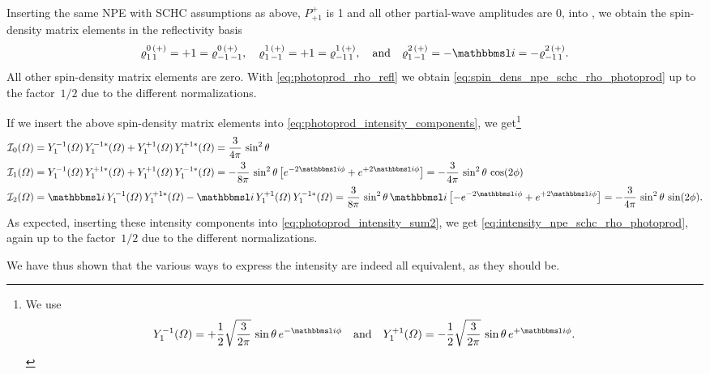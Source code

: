 Inserting the same NPE with SCHC assumptions as above, \ie $P^+_{+1}$
is 1 and all other partial-wave amplitudes are 0, into
, we obtain
the spin-density matrix elements in the reflectivity basis
\begin{equation}
  \varrho^{0\, (+)}_{1\, 1}
  = +1
  = \varrho^{0\, (+)}_{{-1}\, {-1}},
  \quad
  \varrho^{1\, (+)}_{1\, {-1}}
  = +1
  = \varrho^{1\, (+)}_{{-1}\, 1},
  \quad\text{and}\quad
  \varrho^{2\, (+)}_{1\, {-1}}
  = -\imag
  = -\varrho^{2\, (+)}_{{-1}\, 1}.
\end{equation}
All other spin-density matrix elements are zero.  With
\cref{eq:photoprod_rho_refl} we obtain
\cref{eq:spin_dens_npe_schc_rho_photoprod} up to the factor~$1 / 2$
due to the different normalizations.

If we insert the above spin-density matrix elements into
\cref{eq:photoprod_intensity_components}, we get\footnote{%
  We use
  \begin{equation}
    Y_1^{-1}(\Omega)
    = +\frac{1}{2} \sqrt{\frac{3}{2 \pi}}\, \sin \theta\, e^{-\imag \phi}
    \quad\text{and}\quad
    Y_1^{+1}(\Omega)
    = -\frac{1}{2} \sqrt{\frac{3}{2 \pi}}\, \sin \theta\, e^{+\imag \phi}.
  \end{equation}
}
\begin{align*}
  \mathcal{I}_0(\Omega)
  ={}& Y_1^{-1}(\Omega)\, Y_1^{-1 *}(\Omega) + Y_1^{+1}(\Omega)\, Y_1^{+1 *}(\Omega)
  = \frac{3}{4 \pi}\, \sin^2 \theta
  \\
  \mathcal{I}_1(\Omega)
  ={}& Y_1^{-1}(\Omega)\, Y_1^{+1 *}(\Omega) + Y_1^{+1}(\Omega)\, Y_1^{-1 *}(\Omega)
  = -\frac{3}{8 \pi}\, \sin^2 \theta \sBrk[1]{e^{-2 \imag \phi} + e^{+2 \imag \phi}}
  = -\frac{3}{4 \pi}\, \sin^2 \theta\, \cos(2 \phi)
  \\
  \mathcal{I}_2(\Omega)
  ={}& \imag\, Y_1^{-1}(\Omega)\, Y_1^{+1 *}(\Omega) - \imag\, Y_1^{+1}(\Omega)\, Y_1^{-1 *}(\Omega)
  = \frac{3}{8 \pi}\, \sin^2 \theta\, \imag \sBrk[1]{-e^{-2 \imag \phi} + e^{+2 \imag \phi}}
  = -\frac{3}{4 \pi}\, \sin^2 \theta\, \sin(2 \phi).
\end{align*}
As expected, inserting these intensity components into
\cref{eq:photoprod_intensity_sum2}, we get
\cref{eq:intensity_npe_schc_rho_photoprod}, again up to the factor~$1
/ 2$ due to the different normalizations.

We have thus shown that the various ways to express the intensity are
indeed all equivalent, as they should be.
